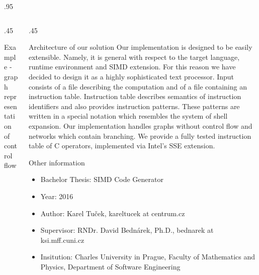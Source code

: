\documentclass[final,hyperref={pdfpagelabels=false}]{beamer}
\newcommand{\msp}{\vspace{1cm}}
\newcommand{\cwdf}{.95\textwidth}
\newcommand{\cwdh}{.45\textwidth}
\begin{document}
\begin{frame}[fragile]
\begin{columns}[T]
\begin{column}{\cwdf}
    \end{column}
  \end{columns}


  \begin{columns}[T]
    \begin{column}{\cwdh}

          \begin{block}{Example - graph representation of control flow}
            
          \end{block}

    \end{column}
    \begin{column}{\cwdh}


            \begin{block}{Architecture of our solution}
              \justify
              Our implementation is designed to be easily extensible. Namely, it is general with respect to the target language, runtime environment and SIMD extension. For this reason we have decided to design it as a highly sophisticated text processor. Input consists of a file describing the computation and of a file containing an instruction table. Instruction table describes semantics of instruction identifiers and also provides instruction patterns. These patterns are written in a special notation which resembles the system of shell expansion. Our implementation handles graphs without control flow and networks which contain branching. We provide a fully tested instruction table of C operators, implemented via Intel's SSE extension. 
            \end{block}
      \msp

          \begin{block}{Other information}
            \begin{itemize}
              \item Bachelor Thesis: SIMD Code Generator
              \item Year: 2016
              \item Author: Karel Tuček, kareltucek at centrum.cz
              \item Supervisor: RNDr. David Bednárek, Ph.D., bednarek at ksi.mff.cuni.cz
              \item Insitution: Charles University in Prague, Faculty of Mathematics and Physics, Department of Software Engineering
            \end{itemize}
          \end{block}



    \end{column}
  \end{columns}


\end{frame}
\end{document}
